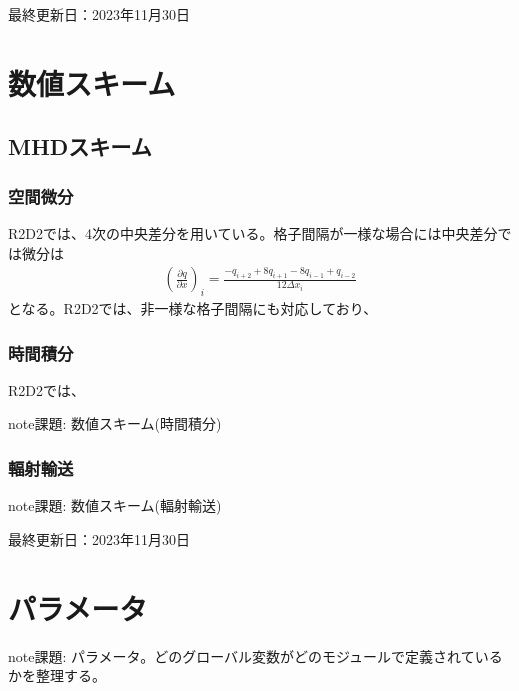 \documentclass[letterpaper,10pt,dvipdfmx,report]{sphinxmanual}
\begin{document}
\sphinxAtStartPar
最終更新日：2023年11月30日

\sphinxstepscope


\chapter{数値スキーム}
\label{\detokenize{scheme:id1}}\label{\detokenize{scheme::doc}}

\section{MHDスキーム}
\label{\detokenize{scheme:mhd}}

\subsection{空間微分}
\label{\detokenize{scheme:id2}}
\sphinxAtStartPar
R2D2では、4次の中央差分を用いている。格子間隔が一様な場合には中央差分では微分は
\begin{equation*}
\begin{split}\left(\frac{\partial q}{\partial x}\right)_i =\frac{-q_{i+2}+8q_{i+1}-8q_{i-1}+q_{i-2}}{12\Delta x_i}\end{split}
\end{equation*}
\sphinxAtStartPar
となる。R2D2では、非一様な格子間隔にも対応しており、


\subsection{時間積分}
\label{\detokenize{scheme:id3}}
\sphinxAtStartPar
R2D2では、

\begin{sphinxadmonition}{note}{\label{\detokenize{scheme:id4}}課題:}
\sphinxAtStartPar
数値スキーム(時間積分)
\end{sphinxadmonition}


\subsection{輻射輸送}
\label{\detokenize{scheme:id5}}
\begin{sphinxadmonition}{note}{\label{\detokenize{scheme:id6}}課題:}
\sphinxAtStartPar
数値スキーム(輻射輸送)
\end{sphinxadmonition}

\sphinxAtStartPar
最終更新日：2023年11月30日

\sphinxstepscope


\chapter{パラメータ}
\label{\detokenize{parameter:id1}}\label{\detokenize{parameter::doc}}
\begin{sphinxadmonition}{note}{\label{\detokenize{parameter:id2}}課題:}
\sphinxAtStartPar
パラメータ。どのグローバル変数がどのモジュールで定義されているかを整理する。
\end{sphinxadmonition}
\end{document}
